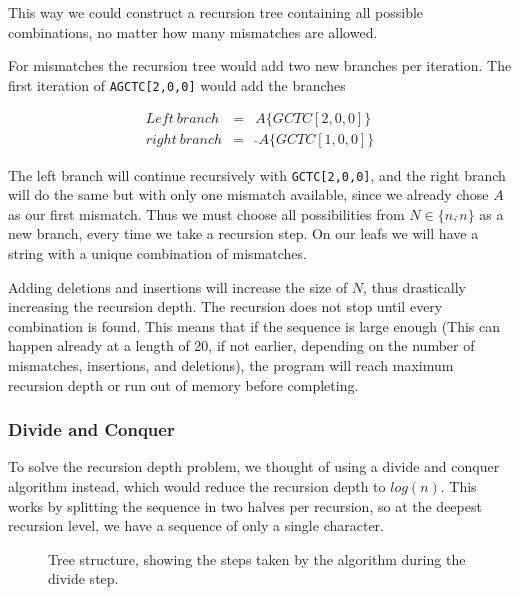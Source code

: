 \documentclass[12pt]{article}
\begin{document}
This way we could construct a recursion tree containing all possible combinations, no matter how many mismatches are allowed.

For mismatches the recursion tree would add two new branches per iteration. The first iteration of \texttt{AGCTC[2,0,0]} would add the branches

\begin{eqnarray}
	Left\ branch &=& A\{GCTC[2,0,0]\} \\
	right\ branch &=&\ \hat{}A\{GCTC[1,0,0]\}
\end{eqnarray}

The left branch will continue recursively with \texttt{GCTC[2,0,0]}, and the right branch will do the same but with only one mismatch available, since we already chose $A$ as our first mismatch. Thus we must choose all possibilities from $N \in \{n, \hat{}n\}$ as a new branch, every time we take a recursion step.
On our leafs we will have a string with a unique combination of mismatches.

Adding deletions and insertions will increase the size of $N$, thus drastically increasing the recursion depth. The recursion does not stop until every combination is found. This means that if the sequence is large enough (This can happen already at a length of 20, if not earlier, depending on the number of mismatches, insertions, and deletions), the program will reach maximum recursion depth or run out of memory before completing.

\subsubsection{Divide and Conquer}

To solve the recursion depth problem, we thought of using a divide and conquer algorithm instead, which would reduce the recursion depth to $log(n)$. This works by splitting the sequence in two halves per recursion, so at the deepest recursion level, we have a sequence of only a single character. 

\begin{figure}[H]
	\centering
	\caption{Tree structure, showing the steps taken by the algorithm during the divide step.}
	\label{fig:tree_example}
\end{figure}
\end{document}
